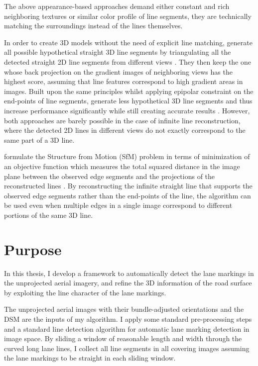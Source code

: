 The above appearance-based approaches demand either constant and rich neighboring textures or similar color profile of line segments, they are technically matching the surroundings instead of the lines themselves.

In order to create 3D models without the need of explicit line matching, \citeauthor{JainJun2010} generate all possible hypothetical straight 3D line segments by triangulating all the detected straight 2D line segments from different views \cite{JainJun2010}. They then keep the one whose back projection on the gradient images of neighboring views has the highest score, assuming that line features correspond to high gradient areas in images. Built upon the same principles whilst applying epipolar constraint on the end-points of line segments, \citeauthor{HoferFeb2013} generate less hypothetical 3D line segments and thus increase performance significantly while still creating accurate results \cite{HoferFeb2013}. However, both approaches are barely possible in the case of infinite line reconstruction, where the detected 2D lines in different views do not exactly correspond to the same part of a 3D line.

\citeauthor{TaylorNov1995} formulate the Structure from Motion (SfM) problem in terms of minimization of an objective function which measures the total squared distance in the image plane between the observed edge segments and the projections of the reconstructed lines \cite{TaylorNov1995}. By reconstructing the infinite straight line that supports the observed edge segments rather than the end-points of the line, the algorithm can be used even when multiple edges in a single image correspond to different portions of the same 3D line.

\section{Purpose}

In this thesis, I develop a framework to automatically detect the lane markings in the unprojected aerial imagery, and refine the 3D information of the road surface by exploiting the line character of the lane markings. 

The unprojected aerial images with their bundle-adjusted orientations and the DSM are the inputs of my algorithm. I apply some standard pre-processing steps and a standard line detection algorithm for automatic lane marking detection in image space. By sliding a window of reasonable length and width through the curved long lane lines, I collect all line segments in all covering images assuming the lane markings to be straight in each sliding window.

